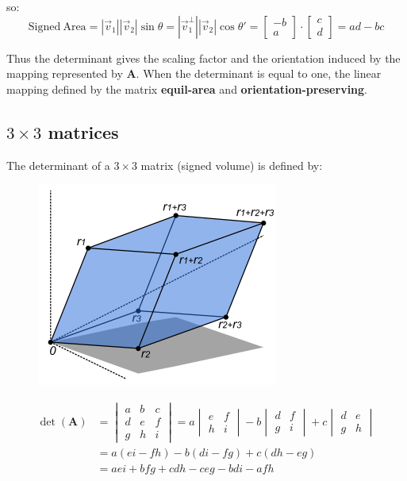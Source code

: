 so:
\begin{equation}
\mathrm{Signed~Area} = |\vec{v}_1||\vec{v}_2|\sin \theta = | \vec{v}_1^\bot||\vec{v}_2|\cos \theta' = \begin{bmatrix}
-b \\
a
\end{bmatrix} \cdot \begin{bmatrix}
c \\
d
\end{bmatrix} = ad-bc
\end{equation}

Thus the determinant gives the scaling factor and the orientation induced by the mapping represented by $ \mathbf{A} $. When the determinant is equal to one, the linear mapping defined by the matrix \textbf{equil-area} and \textbf{orientation-preserving}.

\subsection{$ 3\times 3 $ matrices}
The determinant of a $ 3 \times 3 $ matrix (signed volume) is defined by:

\begin{figure}[h]
	\centering
	\includegraphics[scale=0.5]{Determinant_parallelepiped}
	\caption{}
	\label{fig:Determinant_parallelepiped}
\end{figure}

\begin{equation}
\begin{split}
\det (\mathbf{A}) &= \begin{vmatrix}
a & b & c\\
d & e & f\\
g & h & i
\end{vmatrix} = a\begin{vmatrix}
e & f\\
h & i
\end{vmatrix}-b\begin{vmatrix}
d & f\\
g & i
\end{vmatrix}+c\begin{vmatrix}
d & e\\
g & h
\end{vmatrix} \\
&= a(ei-fh)-b(di-fg)+c(dh-eg)\\
&= aei+bfg+cdh-ceg-bdi-afh
\end{split}
\end{equation}

